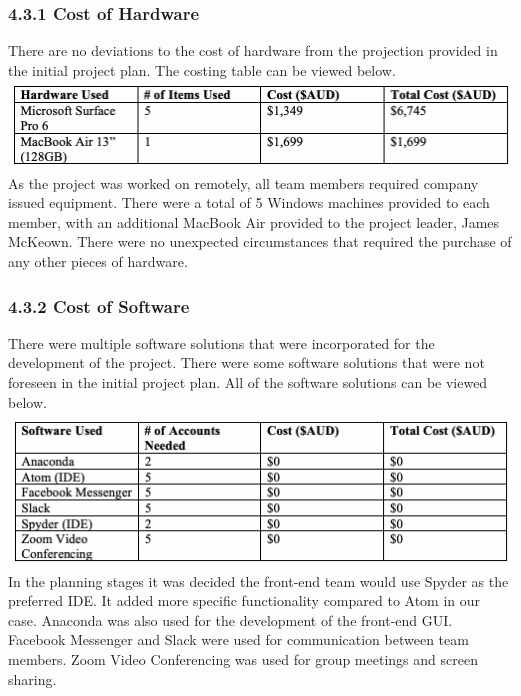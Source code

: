 \documentclass[11pt]{article}
\begin{document}
\begin{adjustwidth}{1cm}{}

\subsubsection{4.3.1 Cost of Hardware}
There are no deviations to the cost of hardware from the projection provided in the initial project plan. The costing table can be viewed below. \\

\includegraphics[scale=0.71]{hardware_table.png} \\

As the project was worked on remotely, all team members required company issued equipment. There were a total of 5 Windows machines provided to each member, with an additional MacBook Air provided to the project leader, James McKeown. There were no unexpected circumstances that required the purchase of any other pieces of hardware.

\subsubsection{4.3.2 Cost of Software}
There were multiple software solutions that were incorporated for the development of the project. There were some software solutions that were not foreseen in the initial project plan. All of the software solutions can be viewed below. \\

\includegraphics[scale=0.71]{software_table.png} \\

In the planning stages it was decided the front-end team would use Spyder as the preferred IDE. It added more specific functionality compared to Atom in our case. Anaconda was also used for the development of the front-end GUI. Facebook Messenger and Slack were used for communication between team members. Zoom Video Conferencing was used for group meetings and screen sharing. \\


\end{adjustwidth}
\end{document}

